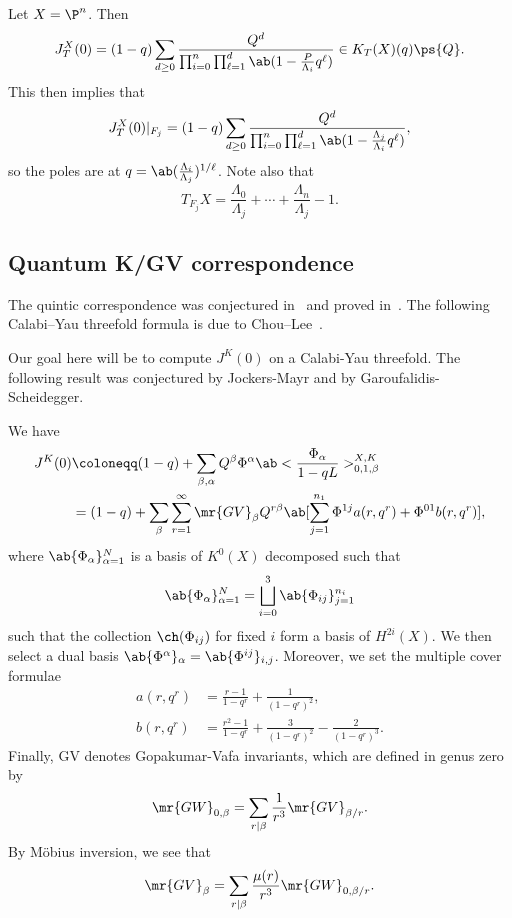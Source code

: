 \begin{exm}
    Let \(X = \P^n\). Then
    \[ J_T^X(0) = (1-q) \sum_{d \geq 0} \frac{Q^d}{\prod_{i=0}^n \prod_{\ell = 1}^d \ab(1 - \frac{P}{\Lambda_i} q^{\ell})} \in K_T(X)(q) \ps{Q}. \]
    This then implies that 
    \[ J_T^X(0) |_{F_j} = (1-q) \sum_{d \geq 0} \frac{Q^d}{\prod_{i=0}^n \prod_{\ell = 1}^d \ab(1 - \frac{\Lambda_j}{\Lambda_i}q^{\ell})}, \]
    so the poles are at \(q = \ab(\frac{\Lambda_i}{\Lambda_j})^{1/\ell}\). Note also that
    \[ T_{F_j} X = \frac{\Lambda_0}{\Lambda_j} + \cdots + \frac{\Lambda_n}{\Lambda_j} - 1. \]
\end{exm}

\subsection{Quantum K/GV correspondence}%
\label{sub:Quantum K/GV correspondence}

The quintic correspondence was conjectured in~\cite{GaroufalidisScheidegger2022} and proved in~\cite{ChouLeeQuintic}. The following Calabi--Yau threefold formula is due to Chou--Lee~\cite{ChouLee2025}.

Our goal here will be to compute \(J^K(0)\) on a Calabi-Yau threefold. The following result was conjectured by Jockers-Mayr and by Garoufalidis-Scheidegger.

\begin{thm}
    We have
    \begin{align*}
        J^K(0) &\coloneqq (1-q) + \sum_{\beta, \alpha} Q^{\beta} \Phi^{\alpha} \ab<\frac{\Phi_{\alpha}}{1-qL}>_{0,1,\beta}^{X,K} \\
        &= (1-q) + \sum_{\beta} \sum_{r=1}^{\infty} \mr{GV}_{\beta} Q^{r\beta} \ab[\sum_{j=1}^{n_1} \Phi^{1j} a(r, q^r) + \Phi^{01} b(r, q^r)],
    \end{align*}
    where \(\ab\{\Phi_{\alpha}\}_{\alpha=1}^N\) is a basis of \(K^0(X)\) decomposed such that
    \[ \ab\{\Phi_{\alpha}\}_{\alpha=1}^N = \bigsqcup_{i=0}^3 \ab\{\Phi_{ij}\}_{j=1}^{n_i} \]
    such that the collection \(\ch(\Phi_{ij})\) for fixed \(i\) form a basis of \(H^{2i}(X)\). We then select a dual basis \(\ab\{\Phi^{\alpha}\}_{\alpha} = \ab\{\Phi^{ij}\}_{i,j}\). Moreover, we set the multiple cover formulae
    \begin{align*}
        a(r, q^r) &= \frac{r-1}{1-q^r} + \frac{1}{(1-q^r)^2}, \\
        b(r, q^r) &= \frac{r^2-1}{1-q^r} + \frac{3}{(1-q^r)^2} - \frac{2}{(1-q^r)^3}.
    \end{align*}
    Finally, GV denotes Gopakumar-Vafa invariants, which are defined in genus zero by
    \[ \mr{GW}_{0,\beta} = \sum_{r \mid \beta} \frac{1}{r^3} \mr{GV}_{\beta/r}. \]
    By M\"obius inversion, we see that
    \[ \mr{GV}_{\beta} = \sum_{r \mid \beta} \frac{\mu(r)}{r^3} \mr{GW}_{0,\beta/r}. \]
\end{thm}

